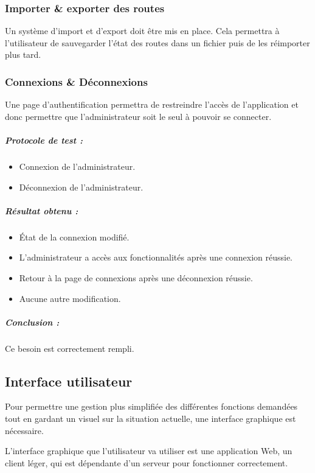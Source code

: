 \subsubsection{Importer \& exporter des routes}
Un système d'import et d'export doit être mis en place. Cela permettra à l'utilisateur de sauvegarder l'état des routes dans un fichier puis de les réimporter plus tard.

\subsubsection{Connexions \& Déconnexions}
Une page d'authentification permettra de restreindre l'accès de l'application et donc permettre que l'administrateur soit le seul à pouvoir se connecter.
\subparagraph{Protocole de test :}
\begin{itemize}
    \item Connexion de l'administrateur.
    \item Déconnexion de l'administrateur.
\end{itemize}
\subparagraph{Résultat obtenu :}
    \begin{itemize}
    \item État de la connexion modifié.
    \item L'administrateur a accès aux fonctionnalités après une connexion réussie.
    \item Retour à la page de connexions après une déconnexion réussie.
    \item Aucune autre modification.
\end{itemize}
\subparagraph{Conclusion :}Ce besoin est correctement rempli.

\subsection{Interface utilisateur}
\label{sssec:ui}

Pour permettre une gestion plus simplifiée des différentes fonctions demandées tout en gardant un visuel sur la situation actuelle, une interface graphique est nécessaire.

L'interface graphique que l'utilisateur va utiliser est une application Web, un client léger, qui est dépendante d'un serveur pour fonctionner correctement.\newline

